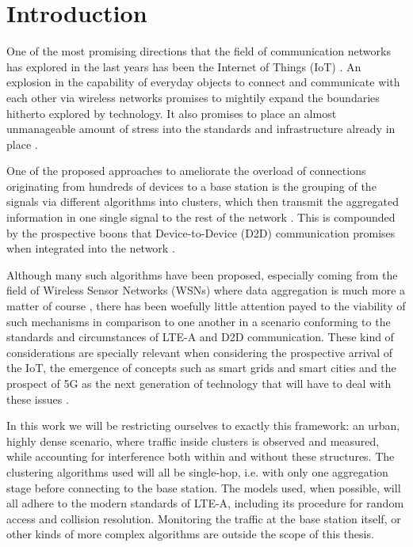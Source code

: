 \chapter{Introduction}

One of the most promising directions that the field of communication networks has explored in the last years has been the Internet of Things (IoT) \cite{Shariatmadari2015a}. An explosion in the capability of everyday objects to connect and communicate with each other via wireless networks promises to mightily expand the boundaries hitherto explored by technology. It also promises to place an almost unmanageable amount of stress into the standards and infrastructure already in place \cite{Polese2016}. 

One of the proposed approaches to ameliorate the overload of connections originating from hundreds of devices to a base station is the grouping of the signals via different algorithms into clusters, which then transmit the aggregated information in one single signal to the rest of the network \cite{Laya2014a}. This is compounded by the prospective boons that Device-to-Device (D2D) communication promises when integrated into the network \cite{6163598}. 

Although many such algorithms have been proposed, especially coming from the field of Wireless Sensor Networks (WSNs) where data aggregation is much more a matter of course \cite{Afsar2014}, there has been woefully little attention payed to the viability of such mechanisms in comparison to one another in a scenario conforming to the standards and circumstances of LTE-A and D2D communication. These kind of considerations are specially relevant when considering the prospective arrival of the IoT, the emergence of concepts such as smart grids and smart cities and the prospect of 5G as the next generation of technology that will have to deal with these issues \cite{6568922}. 

In this work we will be restricting ourselves to exactly this framework: an urban, highly dense scenario, where traffic inside clusters is observed and measured, while accounting for interference both within and without these structures. The clustering algorithms used will all be single-hop, i.e. with only one aggregation stage before connecting to the base station. The models used, when possible, will all adhere to the modern standards of LTE-A, including its procedure for random access and collision resolution. Monitoring the traffic at the base station itself, or other kinds of more complex algorithms are outside the scope of this thesis.

